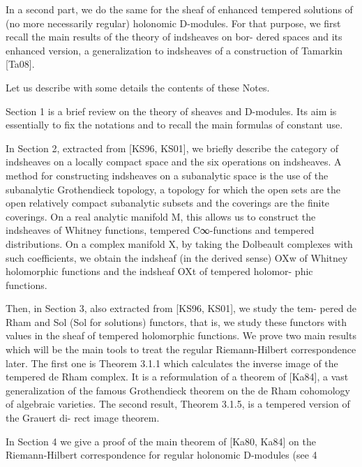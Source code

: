 \documentclass[12pt,a4paper]{jsarticle}
\theoremstyle{plain}
\theoremstyle{definition}
\theoremstyle{remark}
\numberwithin{equation}{section}
\begin{document}
In a second part, 
we do the same for the sheaf of enhanced tempered solutions 
of (no more necessarily regular) holonomic D-modules. 
For that purpose, 
we first recall the main results of the theory of 
indsheaves on bor- dered spaces 
and its enhanced version, 
a generalization to indsheaves of a construction 
of Tamarkin [Ta08].

Let us describe with some details the contents of these Notes.

Section 1 is a brief review on the theory of 
sheaves and D-modules. 
Its aim is essentially to fix the notations 
and to recall the main formulas of constant use.

In Section 2, extracted from [KS96, KS01], we briefly describe the category of indsheaves on a locally compact space and the six operations on indsheaves. A method for constructing indsheaves on a subanalytic space is the use of the subanalytic Grothendieck topology, a topology for which the open sets are the open relatively compact subanalytic subsets and the coverings are the finite coverings. On a real analytic manifold M, this allows us to construct the indsheaves of Whitney functions, tempered C∞-functions and tempered distributions. On a complex manifold X, by taking the Dolbeault complexes with such coefficients, we obtain the indsheaf (in the derived sense) OXw of Whitney holomorphic functions and the indsheaf OXt of tempered holomor- phic functions.

Then, in Section 3, also extracted from [KS96, KS01], we study the tem- pered de Rham and Sol (Sol for solutions) functors, that is, we study these functors with values in the sheaf of tempered holomorphic functions. We prove two main results which will be the main tools to treat the regular Riemann-Hilbert correspondence later. The first one is Theorem 3.1.1 which calculates the inverse image of the tempered de Rham complex. It is a reformulation of a theorem of [Ka84], a vast generalization of the famous Grothendieck theorem on the de Rham cohomology of algebraic varieties. The second result, Theorem 3.1.5, is a tempered version of the Grauert di- rect image theorem.

In Section 4 we give a proof of the main theorem of [Ka80, Ka84] on the Riemann-Hilbert correspondence for regular holonomic D-modules (see
4
 
\end{document}
